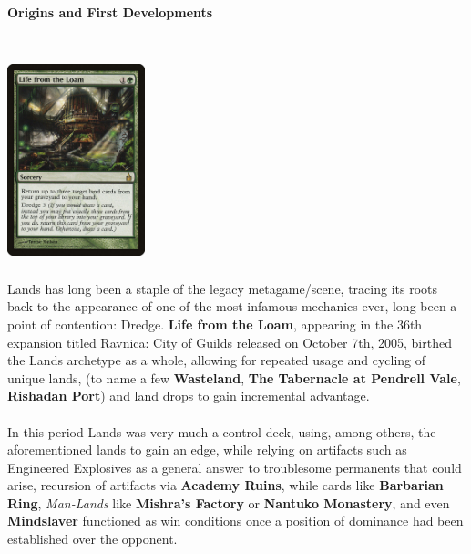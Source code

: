 \documentclass{report}
\begin{document}
\paragraph{Origins and First Developments\\\\}
\begin{center}
\includegraphics [width = 4cm, height = 6cm] {life-from-the-loam}\\
\end{center}
Lands has long been a staple of the legacy metagame/scene, tracing its roots back to the appearance of one of the most infamous mechanics ever, long been a point of contention: Dredge. \textbf{Life from the Loam}, appearing in the 36th expansion titled Ravnica: City of Guilds released on October 7th, 2005, birthed the Lands archetype as a whole, allowing for repeated usage and cycling of unique lands, (to name a few \textbf{Wasteland}, \textbf{The Tabernacle at Pendrell Vale}, \textbf{Rishadan Port}) and land drops to gain incremental advantage.\\\\
 In this period Lands was very much a control deck, using, among others, the aforementioned lands to gain an edge, while relying on artifacts such as Engineered Explosives as a general answer to troublesome permanents that could arise, recursion of artifacts via \textbf{Academy Ruins}, while cards like \textbf{Barbarian Ring}, \emph{Man-Lands} like \textbf{Mishra's Factory} or \textbf{Nantuko Monastery}, and even \textbf{Mindslaver} functioned as win conditions once a position of dominance had been established over the opponent.
\newpage
\end{document}
